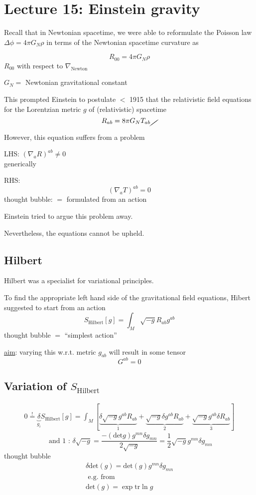 \section{Lecture 15: Einstein gravity}

Recall that in Newtonian spacetime, we were able to reformulate the Poisson law $\Delta \phi = 4\pi G_N \rho$ in terms of the Newtonian spacetime curvature as 

\[
R_{00} = 4\pi G_N \rho
\]
$R_{00}$ with respect to $\nabla_{\text{Newton}}$

$G_N = $ Newtonian gravitational constant

This prompted Einstein to postulate $<$ 1915 that the relativistic field equations for the Lorentzian metric $g$ of (relativistic) spacetime
\[
R_{ab} = 8\pi G_N T_{ab} \cancel{ \quad }
\]

However, this equation suffers from a problem

LHS:
$(\nabla_a R)^{ab} \neq 0$ \\
generically

RHS:
\[
(\nabla_a T)^{ab}  = 0
\]
thought bubble: $=$ formulated from an action

Einstein tried to argue this problem away.  

Nevertheless, the equations cannot be upheld. 

\subsection{Hilbert}

Hilbert was a specialist for variational principles. 

To find the appropriate left hand side of the gravitational field equations, Hibert suggested to start from an action
\[
S_{\text{Hilbert}}[g] = \int_M \sqrt{-g} R_{ab}g^{ab}
\]
thought bubble $=$ ``simplest action''

\underline{aim}: varying this w.r.t. metric $g_{ab}$ will result in some tensor 
\[
G^{ab} = 0
\]

\subsection{Variation of $S_{\text{Hilbert}}$}

\[
\begin{gathered}
  0 \overset{!}{=} \underbrace{\delta}_{g_i} S_{\text{Hilbert}}[g] = \int_M [ \underbrace{ \delta \sqrt{-g} g^{ab}R_{ab} }_{1} + \underbrace{ \sqrt{-g} \delta g^{ab} R_{ab}}_{2} + \underbrace{ \sqrt{-g} g^{ab} \delta R_{ab} }_{3} ] 
\end{gathered}
\]
\[
\text{ and 1 : } \delta \sqrt{-g} = \frac{ - (\text{det}g)g^{mn} \delta g_{mn} }{ 2 \sqrt{-g}} = \frac{1}{2} \sqrt{-g} g^{mn} \delta g_{mn}
\]
thought bubble
\[
\begin{gathered}
  \delta \text{det}(g) = \text{det}(g) g^{mn} \delta g_{mn} \\ 
  \text{ e.g. from } \\
\text{det}(g) = \exp{ \text{tr}{ \ln{g} } }
\end{gathered}
\]

